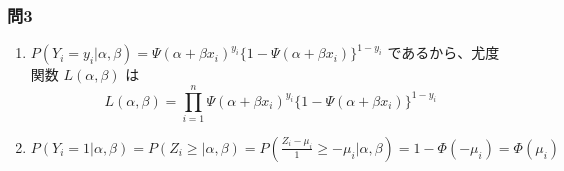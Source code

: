 \documentclass[./main.tex]{subfiles}
\begin{document}
    \subsubsection*{問3}

    \begin{enumerate}
        \item $P (Y_i = y_i \vert \alpha, \beta)
            = \Psi (\alpha + \beta x_i)^{y_i} \{ 1 - \Psi(\alpha + \beta x_i) \}^{1 - y_i}$
            であるから、尤度関数 $L(\alpha, \beta)$ は
        \begin{equation*}
            L(\alpha, \beta)
                = \prod_{i=1}^n \Psi (\alpha + \beta x_i)^{y_i} \{ 1 - \Psi(\alpha + \beta x_i) \}^{1 - y_i}
        \end{equation*}

        \item $P(Y_i = 1 \vert \alpha, \beta)
            = P(Z_i \geq \vert \alpha, \beta)
            = P \left( \frac{Z_i - \mu_i}{1} \geq - \mu_i \vert \alpha, \beta\right)
            = 1 - \Phi (-\mu_i)
            = \Phi (\mu_i)$
    \end{enumerate}
\end{document}
